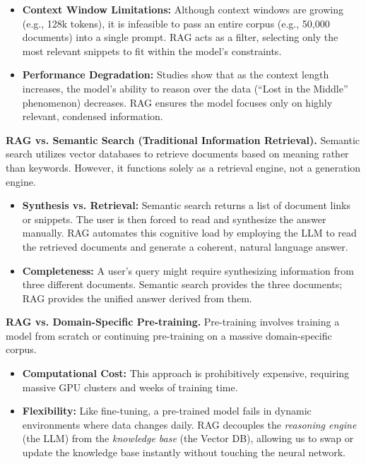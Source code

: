 \begin{itemize}
    \item \textbf{Context Window Limitations:} Although context windows are growing (e.g., 128k tokens), it is infeasible to pass an entire corpus (e.g., 50,000 documents) into a single prompt. RAG acts as a filter, selecting only the most relevant snippets to fit within the model's constraints.
    \item \textbf{Performance Degradation:} Studies show that as the context length increases, the model's ability to reason over the data (``Lost in the Middle'' phenomenon) decreases. RAG ensures the model focuses only on highly relevant, condensed information.
\end{itemize}

\textbf{RAG vs. Semantic Search (Traditional Information Retrieval).}
Semantic search utilizes vector databases to retrieve documents based on meaning rather than keywords. However, it functions solely as a retrieval engine, not a generation engine.

\begin{itemize}
    \item \textbf{Synthesis vs. Retrieval:} Semantic search returns a list of document links or snippets. The user is then forced to read and synthesize the answer manually. RAG automates this cognitive load by employing the LLM to read the retrieved documents and generate a coherent, natural language answer.
    \item \textbf{Completeness:} A user's query might require synthesizing information from three different documents. Semantic search provides the three documents; RAG provides the unified answer derived from them.
\end{itemize}

\textbf{RAG vs. Domain-Specific Pre-training.}
Pre-training involves training a model from scratch or continuing pre-training on a massive domain-specific corpus.

\begin{itemize}
    \item \textbf{Computational Cost:} This approach is prohibitively expensive, requiring massive GPU clusters and weeks of training time.
    \item \textbf{Flexibility:} Like fine-tuning, a pre-trained model fails in dynamic environments where data changes daily. RAG decouples the \textit{reasoning engine} (the LLM) from the \textit{knowledge base} (the Vector DB), allowing us to swap or update the knowledge base instantly without touching the neural network.
\end{itemize}

